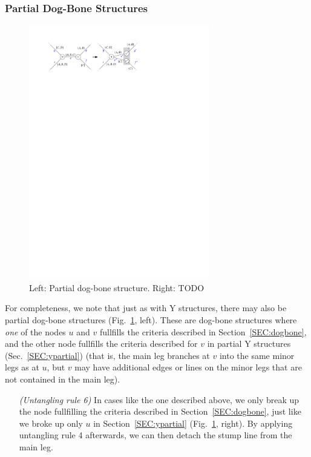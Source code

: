 \documentclass[format=acmsmall, review=false, screen=true]{acmart}
\begin{document}
\subsubsection{Partial Dog-Bone Structures}

\begin{figure}
  \includegraphics[width=0.7\textwidth, page=1]{untangling/dogbone_partial.pdf}
  \caption{Left: Partial dog-bone structure. Right: TODO}  
  \label{FIG:untangle_dogbone_partial}
\end{figure}

For completeness, we note that just as with Y structures, there may also be partial dog-bone structures (Fig.~\ref{FIG:untangle_dogbone_partial}, left).
These are dog-bone structures where \emph{one} of the nodes $u$ and $v$ fullfills the criteria described in Section~\ref{SEC:dogbone}, and the other node fullfills the criteria described for $v$ in partial Y structures (Sec.~\ref{SEC:ypartial}) (that is, the main leg branches at $v$ into the same minor legs as at $u$, but $v$ may have additional edges or lines on the minor legs that are not contained in the main leg). 
\begin{enumerate}[parsep=0.5mm, wide, labelwidth=0mm, itemindent=2.3mm]
  \setlength\itemsep{1pt}
  \item[\emph{(Untangling rule 6)}] In cases like the one described above, we only break up the node fullfilling the criteria described in Section~\ref{SEC:dogbone}, just like we broke up only $u$ in Section~\ref{SEC:ypartial} (Fig.~\ref{FIG:untangle_dogbone_partial}, right). By applying untangling rule 4 afterwards, we can then detach the stump line from the main leg.
\end{enumerate}
\end{document}
